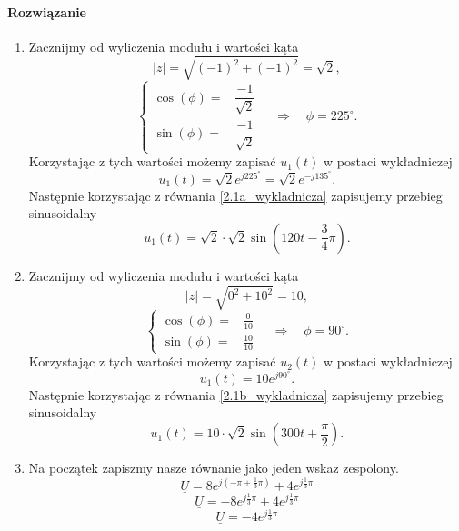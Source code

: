 \documentclass[12pt, a4paper]{article}
\begin{document}
\paragraph{Rozwiązanie}
\begin{enumerate}[label=\alph*)]
  \item Zacznijmy od wyliczenia modułu i wartości kąta
        $$
          |z| = \sqrt{(-1)^2+(-1)^2} = \sqrt{2},
        $$
        $$
          \left\{
          \begin{array}{rl}
            \cos(\phi) = & \dfrac{-1}{\sqrt{2}} \\
            \sin(\phi) = & \dfrac{-1}{\sqrt{2}}
          \end{array}
          \right.
          \quad \Rightarrow \quad \phi = 225^\circ.
        $$
        Korzystając z tych wartości możemy zapisać $u_1(t)$ w postaci
        wykładniczej
        \begin{equation}\label{2.1a_wykladnicza}
          u_1(t) = \sqrt{2}e^{j225^\circ} = \sqrt{2}e^{-j135^\circ}.
        \end{equation}
        Następnie korzystając z równania \ref{2.1a_wykladnicza} zapisujemy
        przebieg sinusoidalny
        $$
          u_1(t) = \sqrt{2}\cdot\sqrt{2}\sin\left(120t-\frac{3}{4}\pi\right).
        $$
  \item Zacznijmy od wyliczenia modułu i wartości kąta
        $$
          |z| = \sqrt{0^2+10^2} = 10,
        $$
        $$
          \left\{
          \begin{array}{rl}
            \cos(\phi) = & \frac{0}{10}  \\
            \sin(\phi) = & \frac{10}{10}
          \end{array}
          \right.
          \quad \Rightarrow \quad \phi = 90^\circ.
        $$
        Korzystając z tych wartości możemy zapisać $u_2(t)$ w postaci
        wykładniczej
        \begin{equation}\label{2.1b_wykladnicza}
          u_1(t) = 10e^{j90^\circ}.
        \end{equation}
        Następnie korzystając z równania \ref{2.1b_wykladnicza} zapisujemy
        przebieg sinusoidalny
        $$
          u_1(t) = 10\cdot\sqrt{2}\sin\left(300t+\frac{\pi}{2}\right).
        $$
  \item Na początek zapiszmy nasze równanie jako jeden wskaz zespolony.
        $$
          \underline{U} = 8e^{j\left(-\pi+\frac{1}{3}\pi\right)}
          +4e^{j\frac{1}{3}\pi}
        $$
        $$
          \underline{U} = -8e^{j\frac{1}{3}\pi}+4e^{j\frac{1}{3}\pi}
        $$
        \begin{equation}\label{2.2c_wykladnicza}
          \underline{U} = -4e^{j\frac{1}{3}\pi}
        \end{equation}


\end{enumerate}
\end{document}
